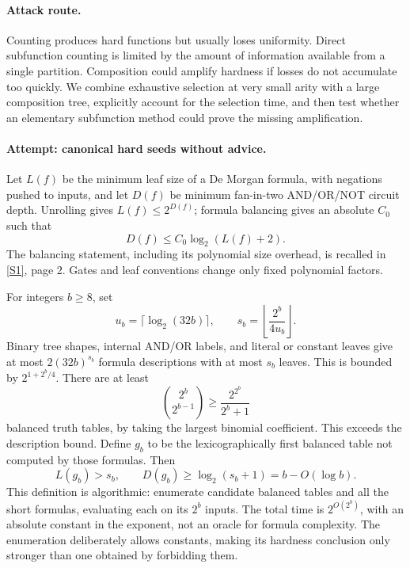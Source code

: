 \documentclass[11pt,a4paper]{article}
\newcommand{\sref}[2]{\hyperlink{source:#1:#2}{[S#2]}}
\numberwithin{equation}{section}
\begin{document}
\paragraph{Attack route.}
Counting produces hard functions but usually loses uniformity. Direct subfunction counting is limited by the amount of information available from a single partition. Composition could amplify hardness if losses do not accumulate too quickly. We combine exhaustive selection at very small arity with a large composition tree, explicitly account for the selection time, and then test whether an elementary subfunction method could prove the missing amplification.

\paragraph{Attempt: canonical hard seeds without advice.}
Let $L(f)$ be the minimum leaf size of a De Morgan formula, with negations pushed to inputs, and let $D(f)$ be minimum fan-in-two AND/OR/NOT circuit depth. Unrolling gives $L(f)\le2^{D(f)}$; formula balancing gives an absolute $C_0$ such that
\begin{equation}\label{r69:balance}
 D(f)\le C_0\log_2(L(f)+2).
\end{equation}
The balancing statement, including its polynomial size overhead, is recalled in \sref{30006707}{1}, page 2. Gates and leaf conventions change only fixed polynomial factors.

For integers $b\ge8$, set
\[
 u_b=\lceil\log_2(32b)\rceil,\qquad
 s_b=\left\lfloor\frac{2^b}{4u_b}\right\rfloor.
\]
Binary tree shapes, internal AND/OR labels, and literal or constant leaves give at most $2(32b)^{s_b}$ formula descriptions with at most $s_b$ leaves. This is bounded by $2^{1+2^b/4}$. There are at least
\[
 \binom{2^b}{2^{b-1}}\ge\frac{2^{2^b}}{2^b+1}
\]
balanced truth tables, by taking the largest binomial coefficient. This exceeds the description bound. Define $g_b$ to be the lexicographically first balanced table not computed by those formulas. Then
\begin{equation}\label{r69:seed}
 L(g_b)>s_b,\qquad D(g_b)\ge\log_2(s_b+1)=b-O(\log b).
\end{equation}
This definition is algorithmic: enumerate candidate balanced tables and all the short formulas, evaluating each on its $2^b$ inputs. The total time is $2^{O(2^b)}$, with an absolute constant in the exponent, not an oracle for formula complexity. The enumeration deliberately allows constants, making its hardness conclusion only stronger than one obtained by forbidding them.
\end{document}
